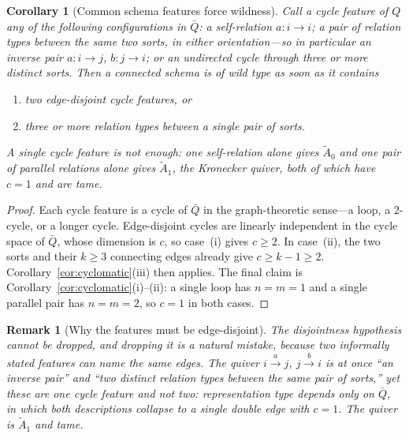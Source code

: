 \documentclass[11pt]{article}
\newtheorem{corollary}[definition]{Corollary}
\newtheorem{remark}[definition]{Remark}
\begin{document}
\begin{corollary}[Common schema features force wildness]
\label{cor:wild-features}
Call a \emph{cycle feature} of $Q$ any of the following configurations in $\bar Q$: a self-relation $a:i\to i$; a pair of relation types between the same two sorts, in either orientation---so in particular an inverse pair $a:i\to j$, $b:j\to i$; or an undirected cycle through three or more distinct sorts. Then a connected schema is of wild type as soon as it contains
\begin{enumerate}[leftmargin=*,label=(\roman*)]
\item two \emph{edge-disjoint} cycle features, or
\item three or more relation types between a single pair of sorts.
\end{enumerate}
A \emph{single} cycle feature is not enough: one self-relation alone gives $\tilde A_0$ and one pair of parallel relations alone gives $\tilde A_1$, the Kronecker quiver, both of which have $c=1$ and are tame.
\end{corollary}
\begin{proof}
Each cycle feature is a cycle of $\bar Q$ in the graph-theoretic sense---a loop, a $2$-cycle, or a longer cycle. Edge-disjoint cycles are linearly independent in the cycle space of $\bar Q$, whose dimension is $c$, so case~(i) gives $c\ge2$. In case~(ii), the two sorts and their $k\ge3$ connecting edges already give $c\ge k-1\ge2$. Corollary~\ref{cor:cyclomatic}(iii) then applies. The final claim is Corollary~\ref{cor:cyclomatic}(i)--(ii): a single loop has $n=m=1$ and a single parallel pair has $n=m=2$, so $c=1$ in both cases.
\end{proof}

\begin{remark}[Why the features must be edge-disjoint]
\label{rem:edge-disjoint}
The disjointness hypothesis cannot be dropped, and dropping it is a natural mistake, because two informally stated features can name the same edges. The quiver $i\xrightarrow{a}j$, $j\xrightarrow{b}i$ is at once ``an inverse pair'' and ``two distinct relation types between the same pair of sorts,'' yet these are one cycle feature and not two: representation type depends only on $\bar Q$, in which both descriptions collapse to a single double edge with $c=1$. The quiver is $\tilde A_1$ and tame.
\end{remark}
\end{document}
